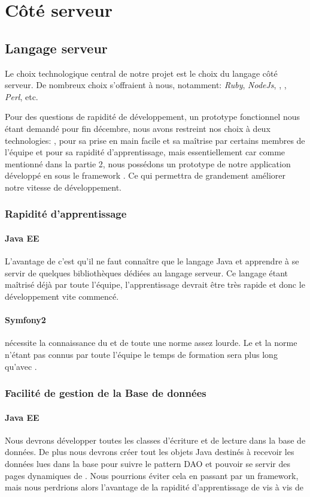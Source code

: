 \section{Côté serveur}

\subsection{Langage serveur}
Le choix technologique central de notre projet est le choix du langage côté serveur. De nombreux choix s'offraient à nous, notamment: \textit{Ruby}, \textit{NodeJs}, \jee, \php, \textit{Perl}, etc.

Pour des questions de rapidité de développement, un prototype fonctionnel nous étant demandé pour fin décembre, nous avons restreint nos choix à deux technologies: \jee, pour sa prise en main facile et sa maîtrise par certains membres de l'équipe et \php pour sa rapidité d'apprentissage, mais essentiellement car comme mentionné dans la partie 2, nous possédons un prototype de notre application développé en \php sous le framework \symfony. Ce qui permettra de grandement améliorer notre vitesse de développement.

\medbreak


\subsubsection{Rapidité d'apprentissage}
\paragraph{Java EE}
L'avantage de \jee c'est qu'il ne faut connaître que le langage Java et apprendre à se servir de quelques bibliothèques dédiées au langage serveur.
Ce langage étant maîtrisé déjà par toute l'équipe, l'apprentissage devrait être très rapide et donc le développement vite commencé.

\paragraph{Symfony2}
\symfony nécessite la connaissance du \php et de toute une norme assez lourde. 
Le \php et la norme n'étant pas connus par toute l'équipe le temps de formation sera plus long qu'avec \jee.

\subsubsection{Facilité de gestion de la Base de données}
\paragraph{Java EE}
Nous devrons développer toutes les classes d'écriture et de lecture dans la base de données. De plus nous devrons créer tout les objets Java destinés à recevoir les données lues dans la base pour suivre le pattern DAO et pouvoir se servir des pages dynamiques de \jee.
Nous pourrions éviter cela en passant par un framework, mais nous perdrions alors l'avantage de la rapidité d'apprentissage de \jee vis à vis de \symfony

